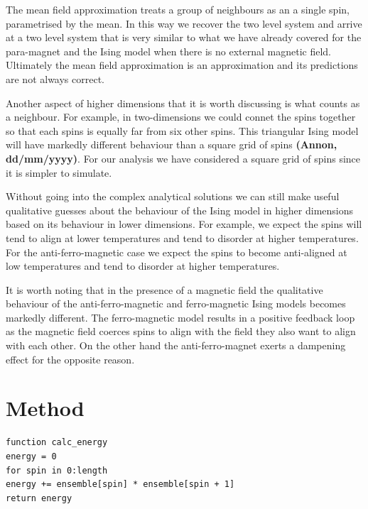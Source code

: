 \documentclass[a4paper, twocolumn]{article}
\def\citation{{\bfseries (Annon, dd/mm/yyyy)}}
\begin{document}
The mean field approximation treats a group of neighbours as an %
a single spin, parametrised by the mean. In this way we recover %
the two level system and arrive at a two level system that is %
very similar to what we have already covered for the para-magnet %
and the Ising model when there is no external magnetic field. %
Ultimately the mean field approximation is an approximation and %
its predictions are not always correct. 


Another aspect of higher dimensions that it is worth discussing %
is what counts as a neighbour. For example, in two-dimensions %
we could connet the spins together so that each spins is equally %
far from six other spins. This triangular Ising model will have %
markedly different behaviour than a square grid of spins \citation. %
For our analysis we have considered a square grid of spins since %
it is simpler to simulate. 


Without going into the complex analytical solutions we can still %
make useful qualitative guesses about the behaviour of the Ising %
model in higher dimensions based on its behaviour in lower %
dimensions. For example, we expect the spins will tend to align %
at lower temperatures and tend to disorder at higher temperatures. %
For the anti-ferro-magnetic case we expect the spins to become %
anti-aligned at low temperatures and tend to disorder at higher %
temperatures.


It is worth noting that in the presence of a magnetic field the %
qualitative behaviour of the anti-ferro-magnetic and ferro-magnetic %
Ising models becomes markedly different. The ferro-magnetic model %
results in a positive feedback loop as the magnetic field coerces %
spins to align with the field they also want to align with each other.
On the other hand the anti-ferro-magnet exerts a dampening effect %
for the opposite reason. 


\section*{Method}
\begin{verbatim}
function calc_energy
energy = 0
for spin in 0:length
energy += ensemble[spin] * ensemble[spin + 1]
return energy
\end{verbatim}
\end{document}
